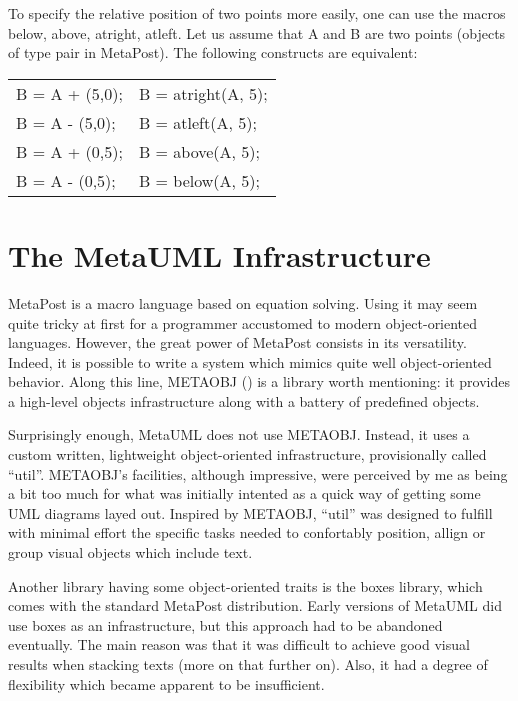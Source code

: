 \documentclass{article}
\newcommand{\code}{\ttfamily}
\begin{document}
To specify the relative position of two points more easily, one can use the macros {\code below}, {\code above}, {\code atright}, {\code atleft}. Let us assume that {\code A} and {\code B} are two points (objects of type {\code pair} in MetaPost). The following constructs are equivalent:

\begin{tabular}{||l|l||}
\hline
{\code B = A + (5,0);} & {\code B = atright(A, 5);} \\
{\code B = A - (5,0);} & {\code B = atleft(A, 5);} \\
{\code B = A + (0,5);} & {\code B = above(A, 5);} \\
{\code B = A - (0,5);} & {\code B = below(A, 5);} \\
\hline
\end{tabular}


\section{The MetaUML Infrastructure}
\label{section:infrastructure}

MetaPost is a macro language based on equation solving. Using it may seem quite
tricky at first for a programmer accustomed to modern object-oriented languages.
However, the great power of MetaPost consists in its versatility. Indeed, it is possible to write
a system which mimics quite well object-oriented behavior. Along this line, METAOBJ
(\cite{metaobj}) is a library worth mentioning: it provides a high-level objects
infrastructure along with a battery of predefined objects.

Surprisingly enough, MetaUML does not use METAOBJ. Instead, it uses a custom written,
lightweight object-oriented infrastructure, provisionally called ``{\code util}''.
METAOBJ's facilities, although impressive, were perceived by me as being a bit too much
for what was initially intented as a quick way of getting some UML diagrams layed out.
Inspired by METAOBJ, ``{\code util}'' was designed to fulfill with minimal effort
the specific tasks needed to confortably position, allign or group visual objects
which include text.

Another library having some object-oriented traits is the {\code boxes}
library, which comes with the standard MetaPost distribution. Early versions of
MetaUML did use {\code boxes} as an infrastructure, but this approach had to be abandoned eventually.
The main reason was that it was difficult to achieve good visual results when stacking texts
(more on that further on). Also, it had a degree of flexibility which became apparent to be
insufficient.
\end{document}
